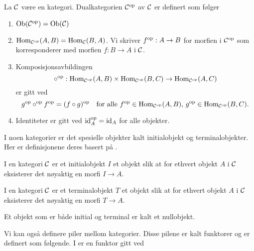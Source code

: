 \begin{definisjon}\label{def:OpKat}
   La $\mathcal{C}$ være en kategori. Dualkategorien
   $\mathcal{C}^{\textnormal{op}}$ av $\mathcal{C}$ er definert som følger
  \begin{enumerate}
    \item $\textnormal{Ob}(\mathcal{C}^{\textnormal{op}}) = \textnormal{Ob}(\mathcal{C})$
    \item $\textnormal{Hom}_{\mathcal{C}^{\textnormal{op}}}(A,B) = \textnormal{Hom}_{\mathcal{C}}(B,A)$. Vi
      skriver $f^{\textnormal{op}}: A\to B$ for morfien i $\mathcal{C}^{\textnormal{op}}$
      som korresponderer med morfien $f: B\to A$
      i $\mathcal{C}$.
    \item Komposisjonsavbildingen
      \[\circ^{\textnormal{op}}:
      \textnormal{Hom}_{\mathcal{C}^{\textnormal{op}}}(A,B) \times \textnormal{Hom}_{\mathcal{C}^{\textnormal{op}}}(B,C)
      \to \textnormal{Hom}_{\mathcal{C}^{\textnormal{op}}}(A,C)\]
      er gitt ved
      \[g^{\textnormal{op}}\circ^{\textnormal{op}} f^{\textnormal{op}} = (f\circ
      g)^{\textnormal{op}}\quad\text{for alle
      $f^{\textnormal{op}}\in\textnormal{Hom}_{\mathcal{C}^{\textnormal{op}}}(A,B),\,
      g^{\textnormal{op}}\in\textnormal{Hom}_{\mathcal{C}^{\textnormal{op}}}(B,C)$.}\]
    \item Identiteter er gitt ved $\textnormal{id}_A^{\textnormal{op}} = \textnormal{id}_A$ for
      alle objekter.
  \end{enumerate}
\end{definisjon}


I noen kategorier er det spesielle objekter kalt initialobjekt og
terminalobjekter. Her er definisjonene deres basert på
\citep[definisjon 1.3.7]{Agore2023}.

\begin{definisjon}\label{def:InitOb}
  I en kategori $\mathcal{C}$ er et initialobjekt $I$ et objekt
  slik at for ethvert objekt $A$ i $\mathcal{C}$ eksisterer det nøyaktig en
  morfi $I\to A$.
\end{definisjon}

\begin{definisjon}\label{def:TermOb}
  I en kategori $\mathcal{C}$ er et terminalobjekt $T$ et
  objekt slik at for ethvert objekt $A$ i $\mathcal{C}$ eksisterer det nøyaktig en morfi $T\to A$.
\end{definisjon}

Et objekt som er både initial og terminal er kalt et nullobjekt.

Vi kan også definere piler mellom kategorier. Disse pilene
er kalt funktorer og er definert som følgende.
I \citep[definisjon 1.5.1]{Agore2023} er en funktor gitt
ved

